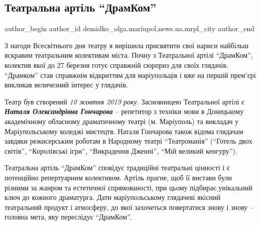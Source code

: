  
 
 
 
 
 
\subsection{Театральна артіль \enquote{ДрамКом}}
\label{sec:22_03_2021.stz.news.ua.mrpl_city.1.teatralna_artil_dramkom}
 
\ifcmt
 author_begin
   author_id demidko_olga.mariupol,news.ua.mrpl_city
 author_end
\fi


З нагоди Всесвітнього дня театру я вирішила присвятити свої нариси найбільш
яскравим театральним колективам міста. Почну з Театральної артілі \enquote{ДрамКом},
колектив якої до 27 березня готує справжній сюрприз для своїх глядачів.
\enquote{Драмком} став справжнім відкриттям для маріупольців і вже на першій прем'єрі
викликав величезний інтерес у глядачів.

Театр був створений \emph{10 жовтня 2019 року}. Засновницею Театральної артілі є
\emph{\textbf{Наталя Олександрівна Гончарова}} – репетитор з техніки мови в Донецькому
академічному обласному драматичному театрі (м. Маріуполь) та викладач у
Маріупольському коледжі мистецтв. Наталя Гончарова також відома глядачам
завдяки режисерським роботам в Народному театрі \enquote{Театроманія} (\enquote{Готель двох
світів}, \enquote{Королівські ігри}, \enquote{Викрадення Дженні}, \enquote{Мій великий кенгуру}).

Театральна артіль \enquote{ДрамКом} сповідує традиційні театральні цінності і є
потенційно репертуарним колективом. Артіль прагне, щоб її вистави були різними
за жанром та естетичної спрямованості, при цьому підбирає унікальний ключ до
кожного драматурга. Дати маріупольському глядачеві якісний театральний продукт
і атмосферу, до якої захочеться повертатися знову і знову – головна мета, яку
переслідує \enquote{ДрамКом}.

